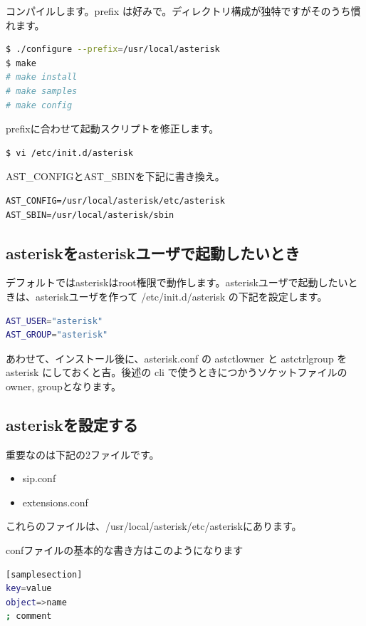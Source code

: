 コンパイルします。prefix は好みで。ディレクトリ構成が独特ですがそのうち慣れます。

\begin{lstlisting}[language=bash]
$ ./configure --prefix=/usr/local/asterisk
$ make
# make install
# make samples 
# make config
\end{lstlisting}

prefixに合わせて起動スクリプトを修正します。

\begin{lstlisting}[language=bash]
$ vi /etc/init.d/asterisk
\end{lstlisting}

AST\_CONFIGとAST\_SBINを下記に書き換え。
\begin{lstlisting}
AST_CONFIG=/usr/local/asterisk/etc/asterisk
AST_SBIN=/usr/local/asterisk/sbin
\end{lstlisting}

\subsection{asteriskをasteriskユーザで起動したいとき}
デフォルトではasteriskはroot権限で動作します。asteriskユーザで起動したいときは、asteriskユーザを作って /etc/init.d/asterisk の下記を設定します。

\begin{lstlisting}[language=bash]
AST_USER="asterisk"
AST_GROUP="asterisk"
\end{lstlisting}

あわせて、インストール後に、asterisk.conf の astctlowner と astctrlgroup を asterisk にしておくと吉。後述の cli で使うときにつかうソケットファイルのowner, groupとなります。

\subsection{asteriskを設定する}
重要なのは下記の2ファイルです。
\begin{itemize}
\item sip.conf
\item extensions.conf
\end{itemize}
これらのファイルは、/usr/local/asterisk/etc/asteriskにあります。

confファイルの基本的な書き方はこのようになります

\begin{lstlisting}[language=bash]
[samplesection]
key=value
object=>name
; comment 
\end{lstlisting}

